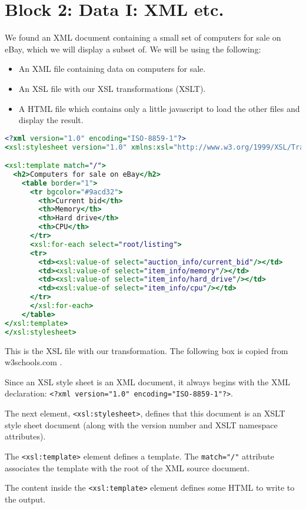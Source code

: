 \section*{Block 2: Data I: XML etc.}

We found an XML document containing a small set of computers for sale on eBay, which we will display a subset of. We will be using the following:
\begin{itemize}
\item An XML file containing data on computers for sale.
\item An XSL file with our XSL transformations (XSLT).
\item A HTML file which contains only a little javascript to load the other files and display the result.
\end{itemize}

\begin{lstlisting}[language=xslt,label=lst:xslt] 
<?xml version="1.0" encoding="ISO-8859-1"?>
<xsl:stylesheet version="1.0" xmlns:xsl="http://www.w3.org/1999/XSL/Transform">

<xsl:template match="/">
  <h2>Computers for sale on eBay</h2>
    <table border="1">
      <tr bgcolor="#9acd32">
        <th>Current bid</th>
        <th>Memory</th>
        <th>Hard drive</th>
        <th>CPU</th>
      </tr>
      <xsl:for-each select="root/listing">
      <tr>
        <td><xsl:value-of select="auction_info/current_bid"/></td>
        <td><xsl:value-of select="item_info/memory"/></td>
        <td><xsl:value-of select="item_info/hard_drive"/></td>
        <td><xsl:value-of select="item_info/cpu"/></td>
      </tr>
      </xsl:for-each>
    </table>
</xsl:template>
</xsl:stylesheet>
\end{lstlisting}

This is the XSL file with our transformation. The following box is copied from w3schools.com \citep{w3xslt}.

\begin{framed}
Since an XSL style sheet is an XML document, it always begins with the XML declaration: \lstinline$<?xml version="1.0" encoding="ISO-8859-1"?>$.

The next element, \lstinline$<xsl:stylesheet>$, defines that this document is an XSLT style sheet document (along with the version number and XSLT namespace attributes).

The \lstinline$<xsl:template>$ element defines a template. The \lstinline$match="/"$ attribute associates the template with the root of the XML source document.

The content inside the \lstinline$<xsl:template>$ element defines some HTML to write to the output.
\end{framed}

